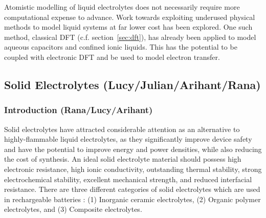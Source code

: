 \documentclass[../main.tex]{subfiles}
\begin{document}
Atomistic modelling of liquid electrolytes does not necessarily require more computational expense to advance. Work towards exploiting underused physical methods to model liquid systems at far lower cost has been explored. One such method, classical DFT (c.f. section~\ref{sec:dft}), has already been applied to model aqueous capacitors\cite{jeanmairet2019study} and confined ionic liquids\cite{forsman_classical_2011}. This has the potential to be coupled with electronic DFT\cite{jeanmairet2019study} and be used to model electron transfer\cite{jeanmairet2019molecular}.




\subsection{Solid Electrolytes (Lucy/Julian/Arihant/Rana)}
\label{sec:solid_electrolytes}

\subsubsection{Introduction (Rana/Lucy/Arihant)}

Solid electrolytes have attracted considerable attention as an alternative to highly-flammable liquid electrolytes, as they significantly improve device safety and have the potential to improve energy and power densities, while also reducing the cost of synthesis. \cite{janek_solid_2016, culver_designing_2018, famprikis_fundamentals_2019, goodenough_li-ion_2013, DIRICAN201927} An ideal solid electrolyte material should possess high electronic resistance, high ionic conductivity, outstanding thermal stability, strong electrochemical stability, excellent mechanical strength, and reduced interfacial resistance. \cite{han2020recent, manthiram2017} There are three different categories of solid electrolytes which are used in rechargeable batteries \cite{DIRICAN201927}: (1) Inorganic ceramic electrolytes, (2) Organic polymer electrolytes, and (3) Composite electrolytes. 
\end{document}
